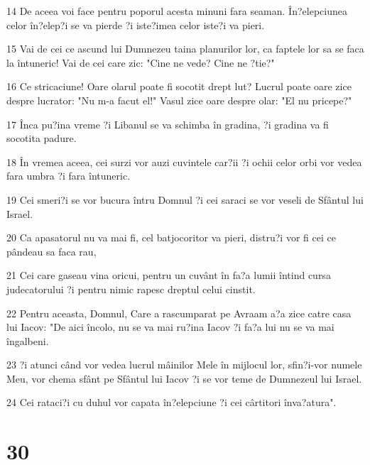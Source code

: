 \par 14 De aceea voi face pentru poporul acesta minuni fara seaman. În?elepciunea celor în?elep?i se va pierde ?i iste?imea celor iste?i va pieri.
\par 15 Vai de cei ce ascund lui Dumnezeu taina planurilor lor, ca faptele lor sa se faca la întuneric! Vai de cei care zic: "Cine ne vede? Cine ne ?tie?"
\par 16 Ce stricaciune! Oare olarul poate fi socotit drept lut? Lucrul poate oare zice despre lucrator: "Nu m-a facut el!" Vasul zice oare despre olar: "El nu pricepe?"
\par 17 Înca pu?ina vreme ?i Libanul se va schimba în gradina, ?i gradina va fi socotita padure.
\par 18 În vremea aceea, cei surzi vor auzi cuvintele car?ii ?i ochii celor orbi vor vedea fara umbra ?i fara întuneric.
\par 19 Cei smeri?i se vor bucura întru Domnul ?i cei saraci se vor veseli de Sfântul lui Israel.
\par 20 Ca apasatorul nu va mai fi, cel batjocoritor va pieri, distru?i vor fi cei ce pândeau sa faca rau,
\par 21 Cei care gaseau vina oricui, pentru un cuvânt în fa?a lumii întind cursa judecatorului ?i pentru nimic rapesc dreptul celui cinstit.
\par 22 Pentru aceasta, Domnul, Care a rascumparat pe Avraam a?a zice catre casa lui Iacov: "De aici încolo, nu se va mai ru?ina Iacov ?i fa?a lui nu se va mai îngalbeni.
\par 23 ?i atunci când vor vedea lucrul mâinilor Mele în mijlocul lor, sfin?i-vor numele Meu, vor chema sfânt pe Sfântul lui Iacov ?i se vor teme de Dumnezeul lui Israel.
\par 24 Cei rataci?i cu duhul vor capata în?elepciune ?i cei cârtitori înva?atura".

\chapter{30}

